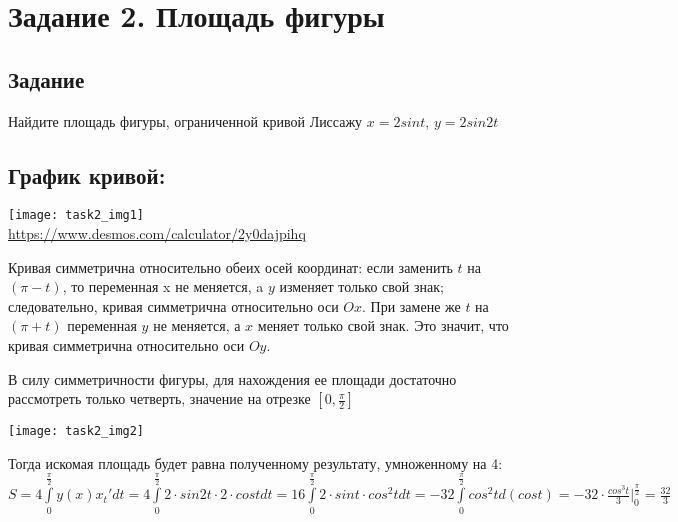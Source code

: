 \section{Задание 2. Площадь фигуры}
\subsection*{Задание}
Найдите площадь фигуры, ограниченной кривой Лиссажу $x = 2sint$, $y = 2sin2t$
\subsection*{График кривой:}
\begin{center}
	\texttt{[image: task2\_img1]}\\
	\url{https://www.desmos.com/calculator/2y0dajpihq}
\end{center}
Кривая симметрична относительно обеих осей координат: если заменить $t$ на $(\pi - t)$, то переменная x не меняется, a $y$ изменяет только свой знак;
следовательно, кривая симметрична относительно оси $Ox$. При замене же $t$ на $(\pi + t)$ переменная $y$ не меняется, а $x$ меняет только свой знак. Это значит, что кривая симметрична относительно оси $Oy$.

В силу симметричности фигуры, для нахождения ее площади достаточно рассмотреть только четверть, значение на отрезке $[0, \frac{\pi}{2}]$ 
\begin{center}
	\texttt{[image: task2\_img2]}\\
\end{center}

Тогда искомая
площадь будет равна полученному результату, умноженному на 4:\\
$S = 4 \int\limits_0^{\frac{\pi}{2}} y(x) x_t 'dt = 4 \int\limits_0^{\frac{\pi}{2}} 2 \cdot sin2t \cdot 2 \cdot cost dt = 16 \int\limits_0^{\frac{\pi}{2}} 2 \cdot sint \cdot cos^{2}t dt = -32 \int\limits_0^{\frac{\pi}{2}} cos^{2}t d(cost) = -32 \cdot {\frac{cos^{3}t}{3}} \bigg|_0^{\frac{\pi}{2}} = {\frac{32}{3}}$ 